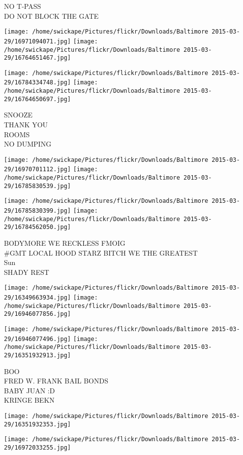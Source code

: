 \documentclass[10pt,letterpaper]{article}
\begin{document}
NO T{-}PASS\\
DO NOT BLOCK THE GATE
\pagebreak

\texttt{[image: /home/swickape/Pictures/flickr/Downloads/Baltimore 2015-03-29/16971094071.jpg]}
\texttt{[image: /home/swickape/Pictures/flickr/Downloads/Baltimore 2015-03-29/16764651467.jpg]}

\texttt{[image: /home/swickape/Pictures/flickr/Downloads/Baltimore 2015-03-29/16784334748.jpg]}
\texttt{[image: /home/swickape/Pictures/flickr/Downloads/Baltimore 2015-03-29/16764650697.jpg]}

SNOOZE\\
THANK YOU\\
ROOMS\\
NO DUMPING
\pagebreak

\texttt{[image: /home/swickape/Pictures/flickr/Downloads/Baltimore 2015-03-29/16970701112.jpg]}
\texttt{[image: /home/swickape/Pictures/flickr/Downloads/Baltimore 2015-03-29/16785830539.jpg]}

\texttt{[image: /home/swickape/Pictures/flickr/Downloads/Baltimore 2015-03-29/16785830399.jpg]}
\texttt{[image: /home/swickape/Pictures/flickr/Downloads/Baltimore 2015-03-29/16784562050.jpg]}

BODYMORE WE RECKLESS FMOIG\\
\#GMT LOCAL HOOD STARZ BITCH WE THE GREATEST\\
Sun\\
SHADY REST
\pagebreak

\texttt{[image: /home/swickape/Pictures/flickr/Downloads/Baltimore 2015-03-29/16349663934.jpg]}
\texttt{[image: /home/swickape/Pictures/flickr/Downloads/Baltimore 2015-03-29/16946077856.jpg]}

\texttt{[image: /home/swickape/Pictures/flickr/Downloads/Baltimore 2015-03-29/16946077496.jpg]}
\texttt{[image: /home/swickape/Pictures/flickr/Downloads/Baltimore 2015-03-29/16351932913.jpg]}

BOO\\
FRED W. FRANK BAIL BONDS\\
BABY JUAN :D\\
KRINGE BEKN
\pagebreak

\texttt{[image: /home/swickape/Pictures/flickr/Downloads/Baltimore 2015-03-29/16351932353.jpg]}

\vspace{0.25in}
\texttt{[image: /home/swickape/Pictures/flickr/Downloads/Baltimore 2015-03-29/16972033255.jpg]}
\end{document}
